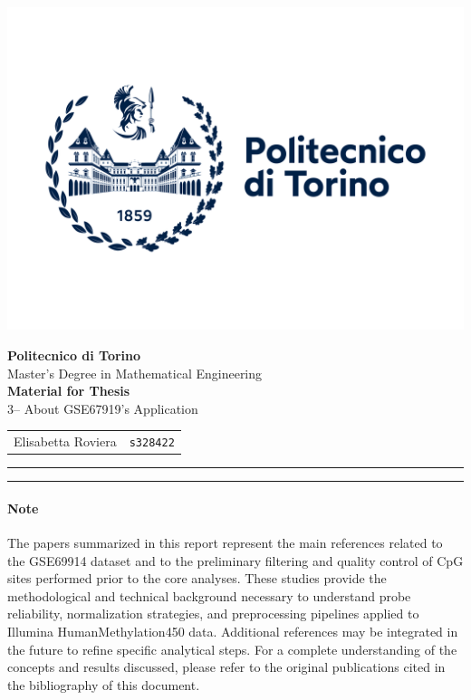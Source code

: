 \documentclass[10pt]{extarticle}
\begin{document}
\noindent
\begin{minipage}{0.3\textwidth}
    \includegraphics[width=1.3\linewidth]{Figures/polito_logo_2021_blu.jpg}
\end{minipage}
\hfill
\begin{minipage}{0.68\textwidth}
    \raggedleft
    {\LARGE \textbf{Politecnico di Torino}}\\[0.2cm]
    {\large Master's Degree in Mathematical Engineering}\\[0.7cm]
    {\large \textbf{Material for Thesis}}\\[0.2cm]
    {\large 3-- About GSE67919's Application }\\[0.7cm]
    \begin{tabular}{rl}
        Elisabetta Roviera & \texttt{s328422} \\
    \end{tabular}
\end{minipage}

\vspace{1cm}
\hrule
\vspace{0.5cm}

\tableofcontents

\vspace{0.5cm}
\hrule
\vspace{1cm}


\justifying

\paragraph{Note} 
The papers summarized in this report represent the main references related to the GSE69914 dataset and to the preliminary filtering and quality control of CpG sites performed prior to the core analyses. These studies provide the methodological and technical background necessary to understand probe reliability, normalization strategies, and preprocessing pipelines applied to Illumina HumanMethylation450 data. Additional references may be integrated in the future to refine specific analytical steps. For a complete understanding of the concepts and results discussed, please refer to the original publications cited in the bibliography of this document.
\end{document}

